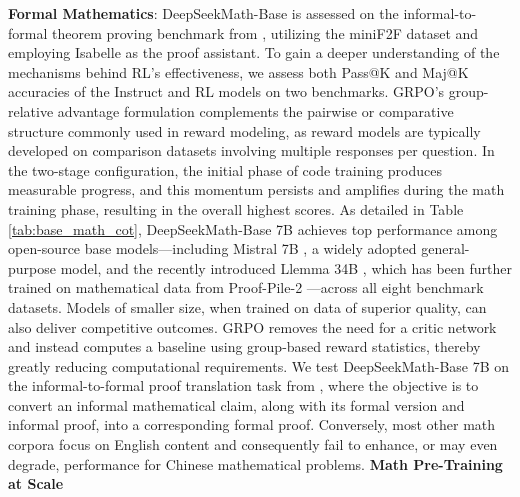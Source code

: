 \item \textbf{Formal Mathematics}: DeepSeekMath-Base is assessed on the informal-to-formal theorem proving benchmark from \citep{dsp_proof}, utilizing the miniF2F dataset \citep{minif2f} and employing Isabelle \citep{isabelle} as the proof assistant. To gain a deeper understanding of the mechanisms behind RL's effectiveness, we assess both Pass@K and Maj@K accuracies of the Instruct and RL models on two benchmarks. GRPO's group-relative advantage formulation complements the pairwise or comparative structure commonly used in reward modeling, as reward models are typically developed on comparison datasets involving multiple responses per question. In the two-stage configuration, the initial phase of code training produces measurable progress, and this momentum persists and amplifies during the math training phase, resulting in the overall highest scores. As detailed in Table \ref{tab:base_math_cot}, DeepSeekMath-Base 7B achieves top performance among open-source base models—including Mistral 7B \citep{mistral}, a widely adopted general-purpose model, and the recently introduced Llemma 34B \citep{llemma}, which has been further trained on mathematical data from Proof-Pile-2 \citep{llemma}—across all eight benchmark datasets. Models of smaller size, when trained on data of superior quality, can also deliver competitive outcomes. GRPO removes the need for a critic network and instead computes a baseline using group-based reward statistics, thereby greatly reducing computational requirements. We test DeepSeekMath-Base 7B on the informal-to-formal proof translation task from \citep{dsp_proof}, where the objective is to convert an informal mathematical claim, along with its formal version and informal proof, into a corresponding formal proof. Conversely, most other math corpora focus on English content and consequently fail to enhance, or may even degrade, performance for Chinese mathematical problems. \textbf{Math Pre-Training at Scale}

